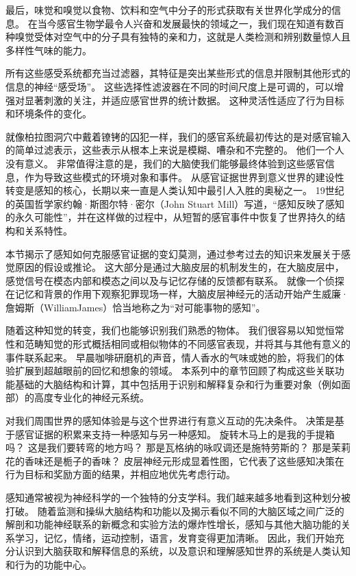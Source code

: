 最后，味觉和嗅觉以食物、饮料和空气中分子的形式获取有关世界化学成分的信息。
在当今感官生物学最令人兴奋和发展最快的领域之一，我们现在知道有数百种嗅觉受体对空气中的分子具有独特的亲和力，这就是人类检测和辨别数量惊人且多样性气味的能力。


所有这些感受系统都充当过滤器，其特征是突出某些形式的信息并限制其他形式的信息的神经“感受场”。
这些选择性滤波器在不同的时间尺度上是可调的，可以增强对显著刺激的关注，并适应感官世界的统计数据。
这种灵活性适应了行为目标和环境条件的变化。


就像柏拉图洞穴中戴着镣铐的囚犯一样，我们的感官系统最初传达的是对感官输入的简单过滤表示，这些表示从根本上来说是模糊、嘈杂和不完整的。
他们一个人没有意义。
非常值得注意的是，我们的大脑使我们能够最终体验到这些感官信息，作为导致这些模式的环境对象和事件。
从感官证据世界到意义世界的建设性转变是感知的核心，长期以来一直是人类认知中最引人入胜的奥秘之一。
19世纪的英国哲学家约翰·斯图尔特·密尔（John Stuart Mill）写道，“感知反映了感知的永久可能性”，并在这样做的过程中，从短暂的感官事件中恢复了世界持久的结构和关系特性。


本节揭示了感知如何克服感官证据的变幻莫测，通过参考过去的知识来发展关于感觉原因的假设或推论。
这大部分是通过大脑皮层的机制发生的，在大脑皮层中，感觉信号在模态内部和模态之间以及与记忆存储的反馈都有联系。
就像一个侦探在记忆和背景的作用下观察犯罪现场一样，大脑皮层神经元的活动开始产生威廉·詹姆斯（WilliamJames）恰当地称之为“对可能事物的感知”。


随着这种知觉的转变，我们也能够识别我们熟悉的物体。
我们很容易以知觉恒常性和范畴知觉的形式概括相同或相似物体的不同感官表现，并将其与其他有意义的事件联系起来。
早晨咖啡研磨机的声音，情人香水的气味或她的脸，将我们的体验扩展到超越眼前的回忆和想象的领域。
本系列中的章节回顾了构成这些关联功能基础的大脑结构和计算，其中包括用于识别和解释复杂和行为重要对象（例如面部）的高度专业化的神经元系统。


对我们周围世界的感知体验是与这个世界进行有意义互动的先决条件。
决策是基于感官证据的积累来支持一种感知与另一种感知。
旋转木马上的是我的手提箱吗？
这是我们要转弯的地方吗？
那是瓦格纳的咏叹调还是施特劳斯的？
那是茉莉花的香味还是栀子的香味？
皮层神经元形成显着性图，它代表了这些感知决策在行为目标和奖励方面的结果，并相应地优先考虑行动。


感知通常被视为神经科学的一个独特的分支学科。我们越来越多地看到这种划分被打破。
随着监测和操纵大脑结构和功能以及揭示看似不同的大脑区域之间广泛的解剖和功能神经联系的新概念和实验方法的爆炸性增长，感知与其他大脑功能的关系学习，记忆，情绪，运动控制，语言，发育变得更加清晰。
因此，我们开始充分认识到大脑获取和解释信息的系统，以及意识和理解感知世界的系统是人类认知和行为的功能中心。



